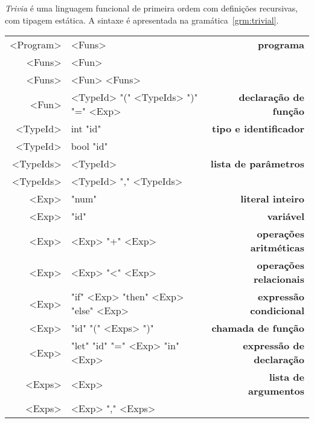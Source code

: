 \documentclass[a4paper,11pt,brazil]{article}
\newcommand{\lang}{\textsl{Trivia}}
\begin{document}
\lang{} é uma linguagem funcional de primeira ordem com definições
recursivas, com tipagem estática. A sintaxe é apresentada na
gramática~\ref{grm:trivial}.

\begin{gramatica}
  \begin{synshorts}
    \begin{mdframed}
    \begin{tabular}{r@{$\;\rightarrow\;$}l>{\bfseries}r}
      <Program> & <Funs>                               & programa                \\[.9em]
      <Funs>    & <Fun>                                &                         \\
      <Funs>    & <Fun> <Funs>                         &                         \\[.9em]
      <Fun>     & <TypeId> "(" <TypeIds> ")" "=" <Exp> & declaração de função    \\[.9em]
      <TypeId>  & int "id"                             & tipo e identificador    \\
      <TypeId>  & bool "id"                            &                         \\[.9em]
      <TypeIds> & <TypeId>                             & lista de parâmetros     \\
      <TypeIds> & <TypeId> "," <TypeIds>               &                         \\[.9em]
      <Exp>     & "num"                                & literal inteiro         \\
      <Exp>     & "id"                                 & variável                \\
      <Exp>     & <Exp> "+" <Exp>                      & operações aritméticas   \\
      <Exp>     & <Exp> "<" <Exp>                      & operações relacionais   \\
      <Exp>     & "if" <Exp> "then" <Exp> "else" <Exp> & expressão condicional   \\
      <Exp>     & "id" "(" <Exps> ")"                  & chamada de função       \\
      <Exp>     & "let" "id" "=" <Exp> "in" <Exp>      & expressão de declaração \\[.9em]
      <Exps>    & <Exp>                                & lista de argumentos     \\
      <Exps>    & <Exp> "," <Exps>                     &                         \\
    \end{tabular}
    \end{mdframed}
  \end{synshorts}
  \caption{Linguagem \lang{}}
  \label{grm:trivial}
\end{gramatica}
\end{document}
